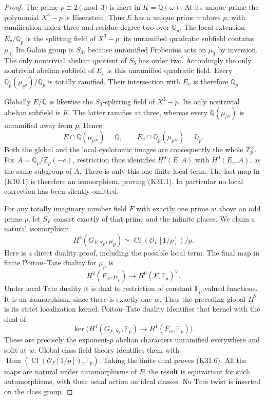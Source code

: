 \begin{proof}
The prime \(p\equiv2\pmod3\) is inert in \(K=\mathbb Q(\omega)\).
At its unique prime the polynomial \(X^3-p\) is Eisenstein.
Thus \(E\) has a unique prime \(v\) above \(p\), with
ramification index three and residue degree two over \(\mathbb Q_p\).
The local extension \(E_v/\mathbb Q_p\) is the splitting field
of \(X^3-p\): its unramified quadratic subfield contains
\(\mu_3\).  Its Galois group is \(S_3\), because unramified
Frobenius acts on \(\mu_3\) by inversion.  The only nontrivial
abelian quotient of \(S_3\) has order two.  Accordingly the
only nontrivial abelian subfield of \(E_v\) is this unramified
quadratic field.  Every \(\mathbb Q_p(\mu_{p^n})/\mathbb Q_p\)
is totally ramified.  Their intersection with \(E_v\) is
therefore \(\mathbb Q_p\).

Globally \(E/\mathbb Q\) is likewise the \(S_3\)-splitting
field of \(X^3-p\).  Its only nontrivial abelian subfield is
\(K\).  The latter ramifies at three, whereas every
\(\mathbb Q(\mu_{p^n})\) is unramified away from \(p\).
Hence
\[
 E\cap\mathbb Q(\mu_{p^\infty})=\mathbb Q,
 \qquad
 E_v\cap\mathbb Q_p(\mu_{p^\infty})=\mathbb Q_p.     \tag{K31.5}
\]
Both the global and the local cyclotomic images are consequently
the whole \(\mathbb Z_p^\times\).  For
\(A=\mathbb Q_p/\mathbb Z_p(-e)\), restriction thus identifies
\(H^0(E,A)\) with \(H^0(E_v,A)\), as the same subgroup of
\(A\).  There is only this one finite local term.  The last
map in (K10.1) is therefore an isomorphism, proving (K31.1).
In particular no local correction has been silently omitted.

For any totally imaginary number field \(F\) with exactly one
prime \(w\) above an odd prime \(p\), let \(S_F\) consist
exactly of that prime and the infinite places.  We claim a natural
isomorphism
\[
 H^2(G_{F,S_F},\mu_p)
       \simeq \operatorname{Cl}(\mathcal O_F[1/p])/p.          \tag{K31.6}
\]
Here is a direct duality proof, including the possible local
term.  The final map in finite Poitou--Tate duality for
\(\mu_p\) is
\[
 H^2(F_w,\mu_p)\longrightarrow H^0(F,\mathbb F_p)^\vee.
\]
Under local Tate duality it is dual to restriction of constant
\(\mathbb F_p\)-valued functions.  It is an isomorphism, since
there is exactly one \(w\).  Thus the preceding global
\(H^2\) is its strict localization kernel.  Poitou--Tate
duality identifies that kernel with the dual of
\[
 \ker\bigl(H^1(G_{F,S_F},\mathbb F_p)
                 \longrightarrow H^1(F_w,\mathbb F_p)\bigr).
\]
These are precisely the exponent-\(p\) abelian characters
unramified everywhere and split at \(w\).  Global class field
theory identifies them with
\(\operatorname{Hom}(\operatorname{Cl}(\mathcal O_F[1/p]),
\mathbb F_p)\).  Taking the finite dual proves (K31.6).
All the maps are natural under automorphisms of \(F\); the
result is equivariant for such automorphisms, with their usual
action on ideal classes.  No Tate twist is inserted on the
class group.


\end{proof}
